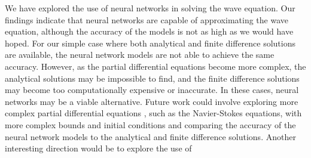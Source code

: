 \documentclass[twoside,11pt]{report}
\begin{document}
    We have explored the use of neural networks in solving the wave equation. Our findings indicate that
    neural networks are capable of approximating the wave equation, although the accuracy of the models
    is not as high as we would have hoped. For our simple case where both analytical and finite difference
    solutions are available, the neural network models are not able to achieve the same accuracy. 
    However, as the partial differential equations become
    more complex, the analytical solutions may be impossible to find, and the finite difference solutions
    may become too computationally expensive or inaccurate. In these cases, neural networks may be a
    viable alternative.
    Future work could involve exploring more complex partial differential equations , such as the
    Navier-Stokes equations, with more complex bounds and initial conditions 
    and comparing the accuracy of the neural network models to the analytical
    and finite difference solutions. Another interesting direction would be to explore the use of


    
    
     










%
%
%
%




\vskip 0.2in

% 

\end{document}
